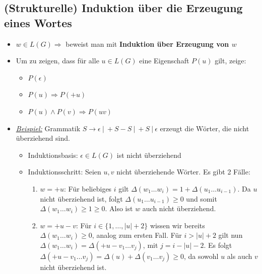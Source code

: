 \documentclass[ieeetran]{article}
\begin{document}
\subsection{(Strukturelle) Induktion über die Erzeugung eines Wortes} %
\label{sub:_strukturelle_induktion_über_die_erzeugung_von_einem_wort}
\begin{itemize}
	\item $w \in L(G) \Longrightarrow$ beweist man mit \textbf{Induktion über Erzeugung von $w$}
 \item Um zu zeigen, dass für alle $u \in L(G)$ eine Eigenschaft $P(u)$ gilt, zeige:
\begin{itemize}
  \item $P(\epsilon)$
  \item $P(u) \Longrightarrow P(+u)$
\item $P(u) \land P(v) \Longrightarrow P(uv)$
\end{itemize}

\item \textit{\underline{Beispiel:}} Grammatik $S \rightarrow \epsilon \ | \ +S-S \ | \ +S \ | \ \epsilon$ erzeugt die Wörter, die nicht überziehend sind.
\begin{itemize}

\item Induktionsbasis: $\epsilon \in L(G)$ ist nicht überziehend
\item Induktionsschritt: Seien $u, v$ nicht überziehende Wörter. Es gibt 2 Fälle:
	\begin{enumerate}
		\item $w=+u$: Für beliebiges $i$ gilt $\Delta(w_1 \dots w_i) = 1 + \Delta(u_1 \ldots u_{i-1})$. Da $u$ nicht überziehend ist, folgt $\Delta(u_1 \ldots u_{i-1}) \ge 0$ und somit $\Delta(w_1 \ldots w_i) \ge 1 \ge 0$. Also ist $w$ auch nicht überziehend.
		\item $w=+u-v$: Für $i \in \{1, \ldots, |u|+2\}$ wissen wir bereits $\Delta(w_1 \ldots w_i) \ge 0$, analog zum ersten Fall. Für $i > |u| + 2$ gilt nun $\Delta(w_1 \ldots w_i) = \Delta(+u-v_1 \ldots v_j)$, mit $j = i - |u| - 2$. Es folgt $\Delta(+u-v_1 \ldots v_j) = \Delta(u) + \Delta(v_1 \ldots v_j) \ge 0$, da sowohl $u$ als auch $v$ nicht überziehend ist.
	\end{enumerate}


\end{itemize}


\end{itemize}
\end{document}
